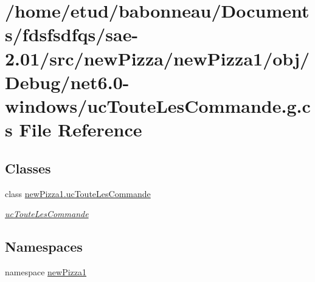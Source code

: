\hypertarget{Debug_2net6_80-windows_2ucTouteLesCommande_8g_8cs}{}\section{/home/etud/babonneau/\+Documents/fdsfsdfqs/sae-\/2.01/src/new\+Pizza/new\+Pizza1/obj/\+Debug/net6.0-\/windows/uc\+Toute\+Les\+Commande.g.\+cs File Reference}
\label{Debug_2net6_80-windows_2ucTouteLesCommande_8g_8cs}
\subsection*{Classes}
\begin{DoxyCompactItemize}
\item 
class \hyperlink{classnewPizza1_1_1ucTouteLesCommande}{new\+Pizza1.\+uc\+Toute\+Les\+Commande}
\begin{DoxyCompactList}\small\item\em \hyperlink{classnewPizza1_1_1ucTouteLesCommande}{uc\+Toute\+Les\+Commande} \end{DoxyCompactList}\end{DoxyCompactItemize}
\subsection*{Namespaces}
\begin{DoxyCompactItemize}
\item 
namespace \hyperlink{namespacenewPizza1}{new\+Pizza1}
\end{DoxyCompactItemize}
